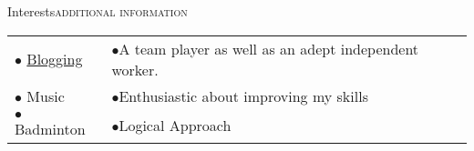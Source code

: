 \documentclass[letterpaper,10.9pt]{article}
\newcommand{\shortersection}[2]{\vspace{11pt}\scshape\raggedright\large{\color{black}\titlerule \vspace{-10pt}#1}\hfill\scshape\large{#2}}
\begin{document}

\shortersection{Interests}{additional information}

\vspace{6pt}
\begin{tabular}{p{11cm} p}
\small
$\bullet$ \color{blue}\href{https://medium.com/@sanchittanwar75}{Blogging} & 
\small
$\bullet$\hspace{2pt}A team player as well as an adept independent worker.\hfill \\
\small
$\bullet$ Music & 
\small
$\bullet$\hspace{2pt}Enthusiastic about improving my skills\hfill \\
\small
$\bullet$ Badminton & 
\small
 $\bullet$\hspace{2pt}Logical Approach\hfill
\end{tabular}
\end{document}
